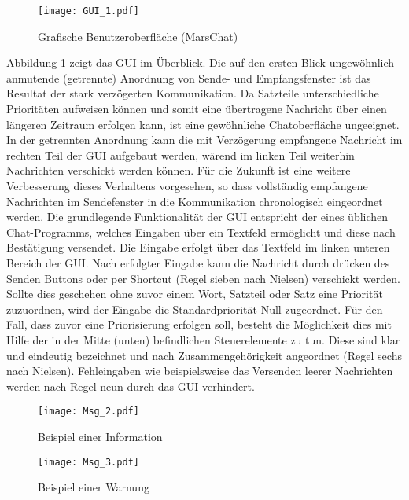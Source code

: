 \begin{figure}[H]
\centering
\texttt{[image: GUI\_1.pdf]}
\caption{Grafische Benutzeroberfläche (MarsChat)}
\label{fig:GUI}
\end{figure}

Abbildung \ref{fig:GUI} zeigt das \gls{GUI} im {\"U}berblick. Die auf den
ersten Blick ungew{\"o}hnlich anmutende (getrennte) Anordnung von Sende- und
Empfangsfenster ist das Resultat der stark verz{\"o}gerten Kommunikation. Da
Satzteile unterschiedliche Priorit{\"a}ten aufweisen k{\"o}nnen und somit eine
{\"u}bertragene Nachricht {\"u}ber einen l{\"a}ngeren Zeitraum erfolgen kann,
ist eine gew{\"o}hnliche Chatoberfl{\"a}che ungeeignet. In der getrennten
Anordnung kann die mit Verz{\"o}gerung empfangene Nachricht im rechten Teil der
\gls{GUI} aufgebaut werden, w{\"a}rend im linken Teil weiterhin Nachrichten verschickt
werden k{\"o}nnen. F{\"u}r die Zukunft ist eine weitere Verbesserung dieses
Verhaltens vorgesehen, so dass vollst{\"a}ndig empfangene Nachrichten im
Sendefenster in die Kommunikation chronologisch eingeordnet werden. Die
grundlegende Funktionalit{\"a}t der \gls{GUI} entspricht der eines {\"u}blichen
Chat-Programms, welches Eingaben {\"u}ber ein Textfeld erm{\"o}glicht und diese
nach Best{\"a}tigung versendet. Die Eingabe erfolgt {\"u}ber das Textfeld im
linken unteren Bereich der \gls{GUI}. Nach erfolgter Eingabe kann die Nachricht
durch dr{\"u}cken des Senden Buttons oder per Shortcut (Regel sieben nach
Nielsen) verschickt werden.
Sollte dies geschehen ohne zuvor einem Wort, Satzteil oder Satz eine
Priorit{\"a}t zuzuordnen, wird der Eingabe die Standardpriorit{\"a}t Null
zugeordnet. F{\"u}r den Fall, dass zuvor eine Priorisierung erfolgen soll,
besteht die M{\"o}glichkeit dies mit Hilfe der in der Mitte (unten) befindlichen
Steuerelemente zu tun. Diese sind klar und eindeutig bezeichnet und nach
Zusammengeh{\"o}rigkeit angeordnet (Regel sechs nach Nielsen). Fehleingaben wie
beispielsweise das Versenden leerer Nachrichten werden nach Regel neun durch das
\gls{GUI} verhindert.

\begin{figure}[H]
\centering
\texttt{[image: Msg\_2.pdf]}
\caption{Beispiel einer Information}
\label{fig:Msg2}
\end{figure}

\begin{figure}[H]
\centering
\texttt{[image: Msg\_3.pdf]}
\caption{Beispiel einer Warnung}
\label{fig:Msg3}
\end{figure}

